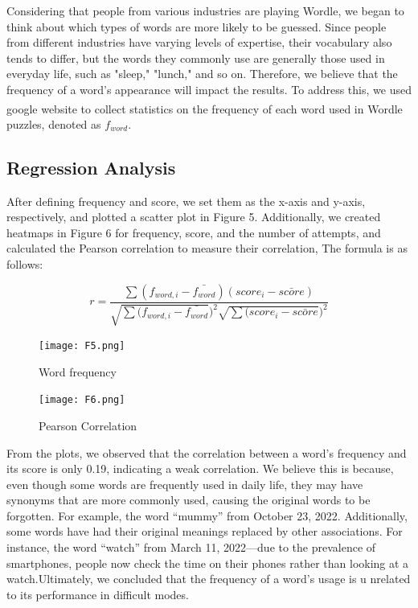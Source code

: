 \documentclass{mcmthesis}  %
\newcommand{\upcite}[1]{\textsuperscript{\cite{#1}}}
\begin{document}
Considering that people from various industries are playing Wordle, we began to think about which types of words are more likely to be 
guessed. Since people from different industries have varying levels of expertise, their vocabulary also tends to differ, but the words 
they commonly use are generally those used in everyday life, such as "sleep," "lunch," and so on. Therefore, we believe that the frequency 
of a word's appearance will impact the results. To address this, we used google website\upcite{2} to collect statistics on the frequency of each word 
used in Wordle puzzles, denoted as $f_{word}$.
\subsection{Regression Analysis}
After defining frequency and score, we set them as the x-axis and y-axis, respectively, and plotted a scatter plot in Figure 5. Additionally, 
we created heatmaps in Figure 6 for frequency, score, and the number of attempts, and calculated the Pearson correlation to measure their correlation,
The formula is as follows:

\begin{equation}  %
        r=\frac{\sum (f_{word,i}-\bar{f_{word}})(score_{i}-\bar{score})}
        {\sqrt{\sum (f_{word,i}-\bar{f_{word} }})^2\sqrt{\sum (score_{i}-\bar{score}})^2} 
\end{equation}  %

\begin{figure}[h]  %
\centering  %
\begin{minipage}[c]{0.48\textwidth}  %
\centering  %
\texttt{[image: F5.png]}  %
\caption{Word frequency} \label{Figure5}  %
\end{minipage}  %
\hspace{0.02\textwidth}
\begin{minipage}[c]{0.48\textwidth}  %
\centering  %
\texttt{[image: F6.png]}  %
\caption{Pearson Correlation} \label{Figure6}  %
\end{minipage}  %
\end{figure}  %

From the plots, we observed that the correlation between a word's frequency and its score is only 0.19, indicating a weak correlation. 
We believe this is because, even though some words are frequently used in daily life, they may have synonyms that are more commonly used, 
causing the original words to be forgotten. For example, the word “mummy” from October 23, 2022. Additionally, some words have had their 
original meanings replaced by other associations. For instance, the word “watch” from March 11, 2022—due to the prevalence of smartphones, 
people now check the time on their phones rather than looking at a watch.Ultimately, we concluded that the frequency of a word's usage is u
nrelated to its performance in difficult modes.
\end{document}
